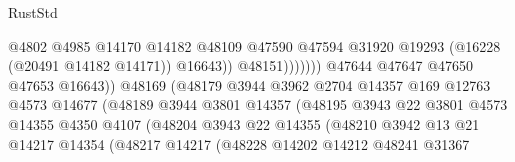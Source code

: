 \begin{lexlean}{RustStd}
\begin{coremodule}
                                                    @4802
                                                    @4985
                                                    @14170
                                                    @14182
                                                    @48109
                                                    @47590
                                                    @47594
                                                    @31920
                                                    @19293
                                                    (@16228 (@20491 @14182 @14171))
                                                    @16643))
                                                @48151)))))))
                                  @47644
                                  @47647
                                  @47650
                                  @47653
                                  @16643))
                              @48169
                              (@48179
                                @3944
                                @3962
                                @2704
                                @14357
                                @169
                                @12763
                                @4573
                                @14677
                                (@48189
                                  @3944
                                  @3801
                                  @14357
                                  (@48195
                                    @3943
                                    @22
                                    @3801
                                    @4573
                                    @14355
                                    @4350
                                    @4107
                                    (@48204
                                      @3943
                                      @22
                                      @14355
                                      (@48210
                                        @3942
                                        @13
                                        @21
                                        @14217
                                        @14354
                                        (@48217
                                          @14217
                                          (@48228
                                            @14202
                                            @14212
                                            @48241
                                            @31367

\end{coremodule}
\end{lexlean}
